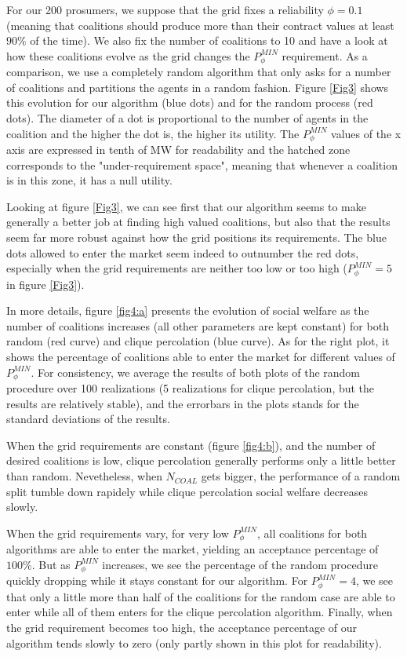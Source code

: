 \documentclass[conference]{IEEEtran}
\begin{document}
For our 200 prosumers, we suppose that the grid fixes a reliability $ \phi = 0.1 $ (meaning that coalitions should produce more than their contract values at least $ 90 \% $ of the time). We also fix the number of coalitions to 10 and have a look at how these coalitions evolve as the grid changes the $ P_{\phi}^{MIN} $ requirement. As a comparison, we use a completely random algorithm that only asks for a number of coalitions and partitions the agents in a random fashion. Figure \ref{Fig3} shows this evolution for our algorithm (blue dots) and for the random process (red dots). The diameter of a dot is proportional to the number of agents in the coalition and the higher the dot is, the higher its utility. The $ P_{\phi}^{MIN} $ values of the x axis are expressed in tenth of MW for readability and the hatched zone corresponds to the "under-requirement space", meaning that whenever a coalition is in this zone, it has a null utility. 

Looking at figure \ref{Fig3}, we can see first that our algorithm seems to make generally a better job at finding high valued coalitions, but also that the results seem far more robust against how the grid positions its requirements. The blue dots allowed to enter the market seem indeed to outnumber the red dots, especially when the grid requirements are neither too low or too high ($ P_{\phi}^{MIN} = 5 $ in figure \ref{Fig3}).

In more details, figure \ref{fig4:a} presents the evolution of social welfare as the number of coalitions increases (all other parameters are kept constant) for both random (red curve) and clique percolation (blue curve). As for the right plot, it shows the percentage of coalitions able to enter the market for different values of $ P_{\phi}^{MIN} $. For consistency, we average the results of both plots of the random procedure over 100 realizations (5 realizations for clique percolation, but the results are relatively stable), and the errorbars in the plots stands for the standard deviations of the results.

When the grid requirements are constant (figure \ref{fig4:b}), and the number of desired coalitions is low, clique percolation generally performs only a little better than random. Nevetheless, when $ N_{COAL} $ gets bigger, the performance of a random split tumble down rapidely while clique percolation social welfare decreases slowly.

When the grid requirements vary, for very low $ P_{\phi}^{MIN} $, all coalitions for both algorithms are able to enter the market, yielding an acceptance percentage of $ 100 \% $. But as $ P_{\phi}^{MIN} $ increases, we see the percentage of the random procedure quickly dropping while it stays constant for our algorithm. For $ P_{\phi}^{MIN} = 4 $, we see that only a little more than half of the coalitions for the random case are able to enter while all of them enters for the clique percolation algorithm. Finally, when the grid requirement becomes too high, the acceptance percentage of our algorithm tends slowly to zero (only partly shown in this plot for readability).
\end{document}

